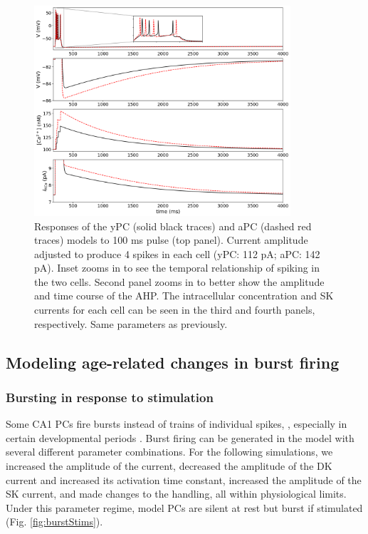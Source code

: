 \documentclass[12pt]{article}
\begin{document}
\begin{figure}[h!]
\centering
\includegraphics[width=0.85\textwidth]{figures/fig3.png}
\caption{Responses of the yPC (solid black traces) and aPC (dashed red traces) models to 100 ms pulse (top panel). Current amplitude adjusted to produce 4 spikes in each cell (yPC: 112 pA; aPC: 142 pA). Inset zooms in to see the temporal relationship of spiking in the two cells. Second panel zooms in to better show the amplitude and time course of the AHP. The intracellular {\Ca} concentration and SK currents for each cell can be seen in the third and fourth panels, respectively. Same parameters as previously. }
\label{fig:AHP}
\end{figure}

\subsection{Modeling age-related changes in burst firing}

\subsubsection{Bursting in response to stimulation}

Some CA1 PCs fire bursts instead of trains of individual spikes, \citep{azouz1996ionic,jensen1994variant,su2001extracellular,golomb2006contribution}, especially in certain developmental periods \citep{chen2005transitional}. Burst firing can be generated in the model with several different parameter combinations. For the following simulations, we increased the amplitude of the {\Na} current, decreased the amplitude of the DK current and increased its activation time constant, increased the amplitude of the SK current, and made changes to the {\Ca} handling, all within physiological limits. Under this parameter regime, model PCs are silent at rest but burst if stimulated (Fig. \ref{fig:burstStims}).
\end{document}
